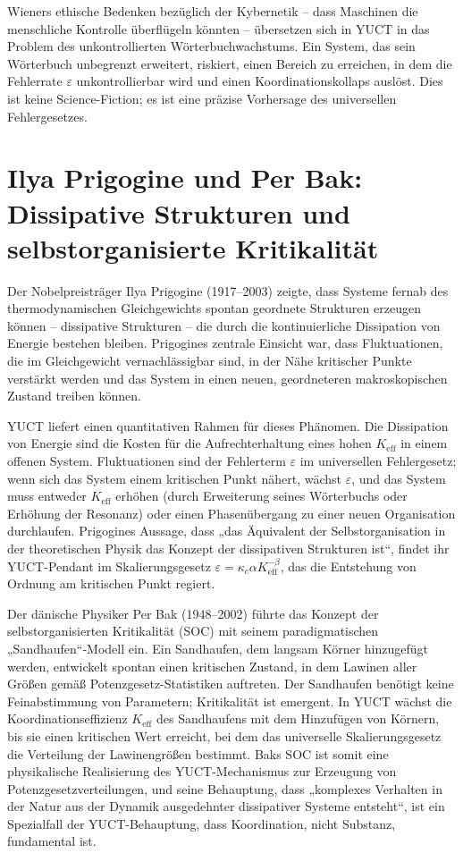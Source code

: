 \documentclass[12pt,a4paper]{article}
\begin{document}
	Wieners ethische Bedenken bezüglich der Kybernetik – dass Maschinen die menschliche Kontrolle überflügeln könnten – übersetzen sich in YUCT in das Problem des unkontrollierten Wörterbuchwachstums. Ein System, das sein Wörterbuch unbegrenzt erweitert, riskiert, einen Bereich zu erreichen, in dem die Fehlerrate \(\varepsilon\) unkontrollierbar wird und einen Koordinationskollaps auslöst. Dies ist keine Science-Fiction; es ist eine präzise Vorhersage des universellen Fehlergesetzes.
	
	\section{Ilya Prigogine und Per Bak: Dissipative Strukturen und selbstorganisierte Kritikalität}
	
	Der Nobelpreisträger Ilya Prigogine (1917–2003) zeigte, dass Systeme fernab des thermodynamischen Gleichgewichts spontan geordnete Strukturen erzeugen können – dissipative Strukturen – die durch die kontinuierliche Dissipation von Energie bestehen bleiben. Prigogines zentrale Einsicht war, dass Fluktuationen, die im Gleichgewicht vernachlässigbar sind, in der Nähe kritischer Punkte verstärkt werden und das System in einen neuen, geordneteren makroskopischen Zustand treiben können.
	
	YUCT liefert einen quantitativen Rahmen für dieses Phänomen. Die Dissipation von Energie sind die Kosten für die Aufrechterhaltung eines hohen \(K_{\mathrm{eff}}\) in einem offenen System. Fluktuationen sind der Fehlerterm \(\varepsilon\) im universellen Fehlergesetz; wenn sich das System einem kritischen Punkt nähert, wächst \(\varepsilon\), und das System muss entweder \(K_{\mathrm{eff}}\) erhöhen (durch Erweiterung seines Wörterbuchs oder Erhöhung der Resonanz) oder einen Phasenübergang zu einer neuen Organisation durchlaufen. Prigogines Aussage, dass „das Äquivalent der Selbstorganisation in der theoretischen Physik das Konzept der dissipativen Strukturen ist“, findet ihr YUCT-Pendant im Skalierungsgesetz \(\varepsilon = \kappa_c \alpha K_{\mathrm{eff}}^{-\beta}\), das die Entstehung von Ordnung am kritischen Punkt regiert.
	
	Der dänische Physiker Per Bak (1948–2002) führte das Konzept der selbstorganisierten Kritikalität (SOC) mit seinem paradigmatischen „Sandhaufen“-Modell ein. Ein Sandhaufen, dem langsam Körner hinzugefügt werden, entwickelt spontan einen kritischen Zustand, in dem Lawinen aller Größen gemäß Potenzgesetz-Statistiken auftreten. Der Sandhaufen benötigt keine Feinabstimmung von Parametern; Kritikalität ist emergent. In YUCT wächst die Koordinationseffizienz \(K_{\mathrm{eff}}\) des Sandhaufens mit dem Hinzufügen von Körnern, bis sie einen kritischen Wert erreicht, bei dem das universelle Skalierungsgesetz die Verteilung der Lawinengrößen bestimmt. Baks SOC ist somit eine physikalische Realisierung des YUCT-Mechanismus zur Erzeugung von Potenzgesetzverteilungen, und seine Behauptung, dass „komplexes Verhalten in der Natur aus der Dynamik ausgedehnter dissipativer Systeme entsteht“, ist ein Spezialfall der YUCT-Behauptung, dass Koordination, nicht Substanz, fundamental ist.
	
\end{document}
